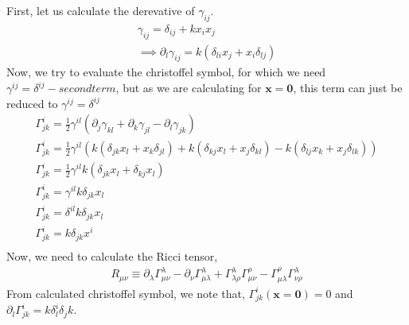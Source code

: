 \documentclass[12pt]{report}
\newcommand{\mbf}[1]{\mathbf{#1}}
\newcommand{\ch}[2]{\Gamma^{#1}_{#2}}
\newcommand{\p}{\partial}
\begin{document}
First, let us calculate the derevative of $\gamma_{ij}$.
\begin{eqnarray*}
\gamma_{ij}=\delta_{ij}+ kx_i x_j\\
\implies \p_l \gamma_{ij}=k (\delta_{li}x_j + x_i\delta_{lj})
\end{eqnarray*}
Now, we try to evaluate the christoffel symbol, for which we need $\gamma^{ij}=\delta^{ij} - second term$, but as we are calculating for $\mbf{x=0}$, this term can just be reduced to $\gamma^{ij}=\delta^{ij}$
\begin{eqnarray*}
\ch{i}{jk}=\frac{1}{2}\gamma^{il}(\p_j \gamma_{kl}+ \p_k \gamma_{jl} - \p_l \gamma_{jk})\\
\ch{i}{jk}=\frac{1}{2}\gamma^{il}(k (\delta_{jk}x_l + x_k\delta_{jl})+ k (\delta_{kj}x_l + x_j\delta_{kl}) - k (\delta_{lj}x_k + x_j\delta_{lk}))\\
\ch{i}{jk}=\frac{1}{2}\gamma^{il}k(\delta_{jk}x_l +  \delta_{kj}x_l)\\
\ch{i}{jk}=\gamma^{il}k \delta_{jk}x_l \\
\ch{i}{jk}=\delta^{il}k \delta_{jk}x_l \\
\ch{i}{jk}=k \delta_{jk}x^i \\
\end{eqnarray*}
Now, we need to calculate the Ricci tensor,
\begin{eqnarray*}
R_{\mu \nu} \equiv \p_{\lambda}\ch{\lambda}{\mu \nu} - \p_{\nu}\ch{\lambda}{\mu \lambda} + \ch{\lambda}{\lambda \rho}\ch{\rho}{\mu \nu} - \ch{\rho}{\mu \lambda}\ch{\lambda}{\nu \rho}
\end{eqnarray*}
From calculated christoffel symbol, we note that, $\ch{i}{jk}(\mbf{x=0})=0$ and $\p_l \ch{i}{jk}=k\delta^i_l \delta_jk$.
\end{document}
